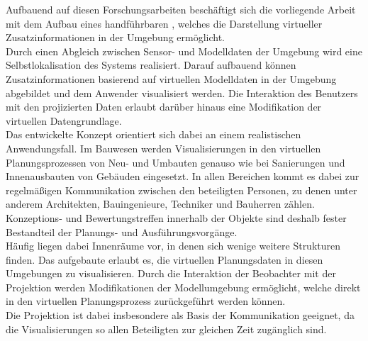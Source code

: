 Aufbauend auf diesen Forschungsarbeiten beschäftigt sich die vorliegende Arbeit mit dem Aufbau eines handführbaren , welches die Darstellung virtueller Zusatzinformationen in der Umgebung ermöglicht.\\
Durch einen Abgleich zwischen Sensor- und Modelldaten der Umgebung wird eine Selbstlokalisation des Systems realisiert. Darauf aufbauend können Zusatzinformationen basierend auf virtuellen Modelldaten in der Umgebung abgebildet und dem Anwender visualisiert werden. Die Interaktion des Benutzers mit den projizierten Daten erlaubt darüber hinaus eine Modifikation der virtuellen Datengrundlage.\\

Das entwickelte Konzept orientiert sich dabei an einem realistischen Anwendungsfall. Im Bauwesen werden Visualisierungen in den virtuellen Planungsprozessen von Neu- und Umbauten genauso wie bei Sanierungen und Innenausbauten von Gebäuden eingesetzt. In allen Bereichen kommt es dabei zur regelmäßigen Kommunikation zwischen den beteiligten Personen, zu denen unter anderem Architekten, Bauingenieure, Techniker und Bauherren zählen. Konzeptions- und Bewertungstreffen innerhalb der Objekte sind deshalb fester Bestandteil der Planungs- und Ausführungsvorgänge.\\
Häufig liegen dabei Innenräume vor, in denen sich wenige weitere Strukturen finden. Das aufgebaute \kps{} erlaubt es, die virtuellen Planungsdaten in diesen Umgebungen zu visualisieren. Durch die Interaktion der Beobachter mit der Projektion werden Modifikationen der Modellumgebung ermöglicht, welche direkt in den virtuellen Planungsprozess zurückgeführt werden können.\\
Die Projektion ist dabei insbesondere als Basis der Kommunikation geeignet, da die Visualisierungen so allen Beteiligten zur gleichen Zeit zugänglich sind.\\


